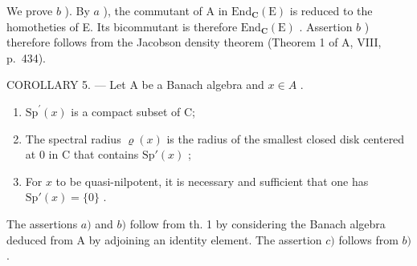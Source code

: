 We prove \(b\) ). By \(a\) ), the commutant of A in \(\mathrm{End}_{\mathbf{C}}(\mathrm{E})\) is reduced to the homotheties of E. Its bicommutant is therefore \(\mathrm{End}_{\mathbf{C}}(\mathrm{E})\) . Assertion \(b\) ) therefore follows from the Jacobson density theorem (Theorem 1 of A, VIII, p.~434).

COROLLARY 5. --- Let A be a Banach algebra and \(x \in A\) .

\begin{enumerate}
\def\labelenumi{\alph{enumi})}
\item
  \(\mathrm{Sp}^{\prime}(x)\) is a compact subset of C;
\item
  The spectral radius \(\varrho(x)\) is the radius of the smallest closed disk centered at 0 in C that contains \(\mathrm{Sp}'(x)\) ;
\item
  For \(x\) to be quasi-nilpotent, it is necessary and sufficient that one has \(\mathrm{Sp}'(x) = \{0\}\) .
\end{enumerate}

The assertions \(a)\) and \(b)\) follow from th. 1 by considering the Banach algebra deduced from A by adjoining an identity element. The assertion \(c)\) follows from \(b)\) .

